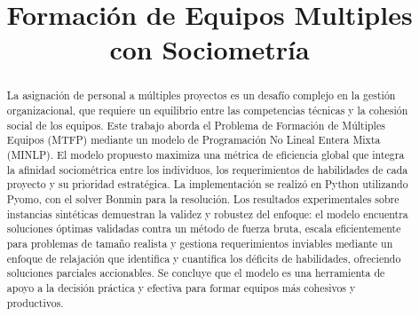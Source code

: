 \documentclass[conference]{IEEEtran}
\begin{document}
\title{Formación de Equipos Multiples con Sociometría}

\author{
}

\maketitle

\begin{abstract}
    La asignación de personal a múltiples proyectos es un desafío complejo en la gestión organizacional, que requiere un equilibrio entre las competencias técnicas y la cohesión social de los equipos. Este trabajo aborda el Problema de Formación de Múltiples Equipos (MTFP) mediante un modelo de Programación No Lineal Entera Mixta (MINLP). El modelo propuesto maximiza una métrica de eficiencia global que integra la afinidad sociométrica entre los individuos, los requerimientos de habilidades de cada proyecto y su prioridad estratégica. La implementación se realizó en Python utilizando Pyomo, con el solver Bonmin para la resolución. Los resultados experimentales sobre instancias sintéticas demuestran la validez y robustez del enfoque: el modelo encuentra soluciones óptimas validadas contra un método de fuerza bruta, escala eficientemente para problemas de tamaño realista y gestiona requerimientos inviables mediante un enfoque de relajación que identifica y cuantifica los déficits de habilidades, ofreciendo soluciones parciales accionables. Se concluye que el modelo es una herramienta de apoyo a la decisión práctica y efectiva para formar equipos más cohesivos y productivos.
\end{abstract}
\end{document}
